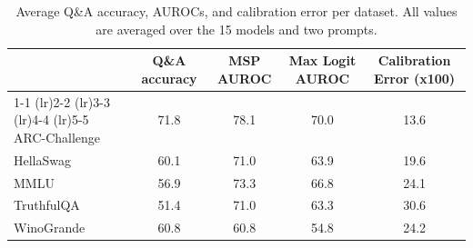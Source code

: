 \begin{table}[h!]
\caption{Average Q\&A accuracy, AUROCs, and calibration error per dataset. All values are averaged over the 15 models and two prompts.}
\label{tab:dataset}
\centering
\begin{tabular}{lcccc}
\toprule
 & Q\&A accuracy & MSP AUROC & Max Logit AUROC & Calibration Error (x100) \\ 
\cmidrule(lr){1-1} \cmidrule(lr){2-2} \cmidrule(lr){3-3} \cmidrule(lr){4-4} \cmidrule(lr){5-5}
ARC-Challenge & 71.8 & 78.1 & 70.0 & 13.6\\
HellaSwag & 60.1 & 71.0 & 63.9 & 19.6\\
MMLU & 56.9 & 73.3 & 66.8 & 24.1\\
TruthfulQA & 51.4 & 71.0 & 63.3 & 30.6\\
WinoGrande & 60.8 & 60.8 & 54.8 & 24.2\\
\bottomrule
\end{tabular}
\end{table}
